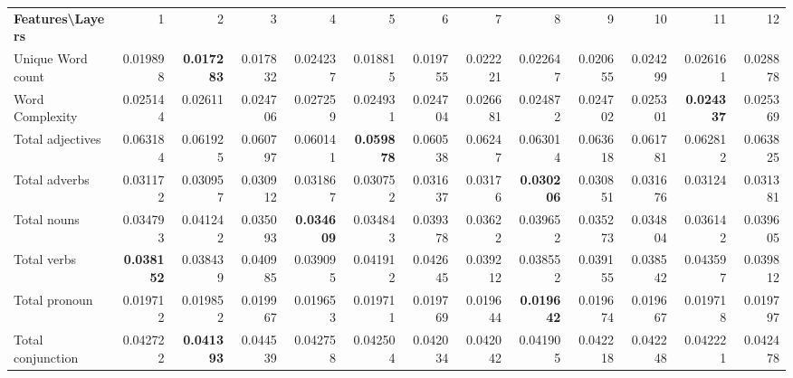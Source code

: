 \documentclass[sigconf]{acmart}
\begin{document}
\begin{table*}[]
\end{table*}



\begin{table*}[]
\begin{adjustbox}{width=1\textwidth}
\begin{tabular}{@{}l|rrrrrrrrrrrr@{}}
\toprule
\textbf{Features\textbackslash{}Layers} & 1                 & 2                 & 3        & 4                 & 5                 & 6        & 7        & 8                 & 9        & 10                & 11                & 12       \\
Unique Word count                       & 0.019898          & \textbf{0.017283} & 0.017832 & 0.024237          & 0.018815          & 0.019755 & 0.022221 & 0.022647          & 0.020655 & 0.024299          & 0.026161          & 0.028878 \\
Word Complexity                         & 0.025144          & 0.02611           & 0.024706 & 0.027259          & 0.024931          & 0.024704 & 0.026681 & 0.024872          & 0.024702 & 0.025301          & \textbf{0.024337} & 0.025369 \\
Total adjectives                        & 0.063184          & 0.061925          & 0.060797 & 0.060141          & \textbf{0.059878} & 0.060538 & 0.06247  & 0.063014          & 0.063618 & 0.061781          & 0.062812          & 0.063825 \\
Total adverbs                           & 0.031172          & 0.030957          & 0.030912 & 0.031867          & 0.030752          & 0.031637 & 0.03176  & \textbf{0.030206} & 0.030851 & 0.031676          & 0.03124           & 0.031381 \\
Total nouns                             & 0.034793          & 0.041242          & 0.035093 & \textbf{0.034609} & 0.034843          & 0.039378 & 0.03622  & 0.039652          & 0.035273 & 0.034804          & 0.036142          & 0.039605 \\
Total verbs                             & \textbf{0.038152} & 0.038439          & 0.040985 & 0.039095          & 0.041912          & 0.042645 & 0.039212 & 0.038552          & 0.039155 & 0.038542          & 0.043597          & 0.039812 \\
Total pronoun                           & 0.019712          & 0.019852          & 0.019967 & 0.019653          & 0.019711          & 0.019769 & 0.019644 & \textbf{0.019642} & 0.019674 & 0.019667          & 0.019718          & 0.019797 \\
Total conjunction                       & 0.042722          & \textbf{0.041393} & 0.044539 & 0.042758          & 0.042504          & 0.042034 & 0.042042 & 0.041905          & 0.042218 & 0.042248          & 0.042221          & 0.042478 \\

\end{tabular}
\end{adjustbox}
\end{table*}
\end{document}
